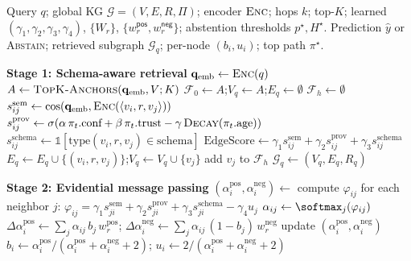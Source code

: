 
\begin{algorithm}[t]
\caption{QUEST-KG inference for a single query}
\label{alg:quest-kg}
\begin{algorithmic}[1]
\Require Query $q$; global KG $\mathcal{G}=(V,E,R,\Pi)$;
         encoder $\textsc{Enc}$; hops $k$; top-$K$;
         learned $(\gamma_1,\gamma_2,\gamma_3,\gamma_4)$, $\{W_r\}$, $\{w_r^{\textsf{pos}},w_r^{\textsf{neg}}\}$;
         abstention thresholds $p^\star, H^\star$.
\Ensure Prediction $\hat{y}$ or \textsc{Abstain};
        retrieved subgraph $\mathcal{G}_q$; per-node $(b_i,u_i)$; top path $\pi^\star$.

\Statex \textbf{Stage 1: Schema-aware retrieval}
\State $\mathbf{q}_{\text{emb}} \gets \textsc{Enc}(q)$
\State $A \gets \textsc{TopK-Anchors}(\mathbf{q}_{\text{emb}}, V; K)$ 
\State $\mathcal{F}_0 \gets A$;\quad $V_q \gets A$;\quad $E_q \gets \emptyset$
  \State $\mathcal{F}_h \gets \emptyset$
      \State $s^{\text{sem}}_{ij} \gets \cos(\mathbf{q}_{\text{emb}}, \textsc{Enc}(\langle v_i, r, v_j \rangle))$
      \State $s^{\text{prov}}_{ij} \gets \sigma(\alpha\,\pi_t.\text{conf} + \beta\,\pi_t.\text{trust} - \gamma\,\textsc{Decay}(\pi_t.\text{age}))$
      \State $s^{\text{schema}}_{ij} \gets \mathbb{1}[\text{type}(v_i, r, v_j) \in \text{schema}]$
      \State $\text{EdgeScore} \gets \gamma_1 s^{\text{sem}}_{ij} + \gamma_2 s^{\text{prov}}_{ij} + \gamma_3 s^{\text{schema}}_{ij}$
         \State $E_q \gets E_q \cup \{(v_i, r, v_j)\}$;\quad $V_q \gets V_q \cup \{v_j\}$
         \State add $v_j$ to $\mathcal{F}_h$
      \EndIf
    \EndFor
  \EndFor
\EndFor
\State $\mathcal{G}_q \gets (V_q, E_q, R_q)$

\Statex \textbf{Stage 2: Evidential message passing}
  \State $(\alpha_i^{\text{pos}}, \alpha_i^{\text{neg}}) \gets$
           
\EndFor
{}
    \State compute $\varphi_{ij}$ for each neighbor $j$:
           $\varphi_{ij} = \gamma_1 s^{\text{sem}}_{ji} + \gamma_2 s^{\text{prov}}_{ji} + \gamma_3 s^{\text{schema}}_{ji} - \gamma_4 u_j$
    \State $\alpha_{ij} \gets \softmax_j(\varphi_{ij})$
    \State $\Delta\alpha_i^{\text{pos}} \gets \sum_j \alpha_{ij}\,b_j\,w_r^{\text{pos}}$;\quad
           $\Delta\alpha_i^{\text{neg}} \gets \sum_j \alpha_{ij}\,(1{-}b_j)\,w_r^{\text{neg}}$
    \State update $(\alpha_i^{\text{pos}}, \alpha_i^{\text{neg}})$
  \EndFor
\EndFor
\State $b_i \gets \alpha_i^{\text{pos}} / (\alpha_i^{\text{pos}} + \alpha_i^{\text{neg}} + 2)$;\quad
       $u_i \gets 2 / (\alpha_i^{\text{pos}} + \alpha_i^{\text{neg}} + 2)$


\end{algorithmic}
\end{algorithm}
